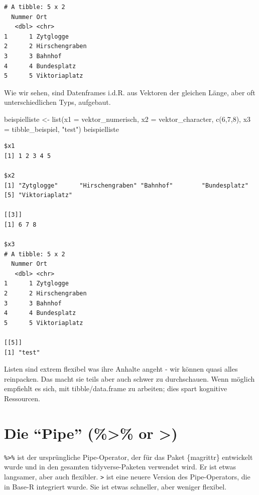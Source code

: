 \documentclass[
  letterpaper,
  DIV=11,
  numbers=noendperiod]{scrreprt}
\newenvironment{Shaded}{\begin{snugshade}}{\end{snugshade}}
\newcommand{\AttributeTok}[1]{\textcolor[rgb]{0.40,0.45,0.13}{#1}}
\newcommand{\DecValTok}[1]{\textcolor[rgb]{0.68,0.00,0.00}{#1}}
\newcommand{\FunctionTok}[1]{\textcolor[rgb]{0.28,0.35,0.67}{#1}}
\newcommand{\NormalTok}[1]{\textcolor[rgb]{0.00,0.23,0.31}{#1}}
\newcommand{\OtherTok}[1]{\textcolor[rgb]{0.00,0.23,0.31}{#1}}
\newcommand{\StringTok}[1]{\textcolor[rgb]{0.13,0.47,0.30}{#1}}
\begin{document}
\begin{verbatim}
# A tibble: 5 x 2
  Nummer Ort           
   <dbl> <chr>         
1      1 Zytglogge     
2      2 Hirschengraben
3      3 Bahnhof       
4      4 Bundesplatz   
5      5 Viktoriaplatz 
\end{verbatim}

Wie wir sehen, sind Datenframes i.d.R. aus Vektoren der gleichen Länge,
aber oft unterschiedlichen Typs, aufgebaut.

\begin{Shaded}
\begin{Highlighting}[]
\NormalTok{beispielliste }\OtherTok{\textless{}{-}} \FunctionTok{list}\NormalTok{(}\AttributeTok{x1 =}\NormalTok{ vektor\_numerisch, }\AttributeTok{x2 =}\NormalTok{ vektor\_character, }\FunctionTok{c}\NormalTok{(}\DecValTok{6}\NormalTok{,}\DecValTok{7}\NormalTok{,}\DecValTok{8}\NormalTok{), }\AttributeTok{x3 =}\NormalTok{ tibble\_beispiel, }\StringTok{"test"}\NormalTok{)}
\NormalTok{beispielliste}
\end{Highlighting}
\end{Shaded}

\begin{verbatim}
$x1
[1] 1 2 3 4 5

$x2
[1] "Zytglogge"      "Hirschengraben" "Bahnhof"        "Bundesplatz"   
[5] "Viktoriaplatz" 

[[3]]
[1] 6 7 8

$x3
# A tibble: 5 x 2
  Nummer Ort           
   <dbl> <chr>         
1      1 Zytglogge     
2      2 Hirschengraben
3      3 Bahnhof       
4      4 Bundesplatz   
5      5 Viktoriaplatz 

[[5]]
[1] "test"
\end{verbatim}

Listen sind extrem flexibel was ihre Anhalte angeht - wir können quasi
alles reinpacken. Das macht sie teils aber auch schwer zu durchschauen.
Wenn möglich empfiehlt es sich, mit tibble/data.frame zu arbeiten; dies
spart kognitive Ressourcen.


\chapter{Die ``Pipe'' (\%\textgreater\% or
\textbar\textgreater)}\label{die-pipe-or}

\texttt{\%\textgreater{}\%} ist der ursprüngliche Pipe-Operator, der für
das Paket \{magrittr\} entwickelt wurde und in den gesamten
tidyverse-Paketen verwendet wird. Er ist etwas langsamer, aber auch
flexibler. \texttt{\textbar{}\textgreater{}} ist eine neuere Version des
Pipe-Operators, die in Base-R integriert wurde. Sie ist etwas schneller,
aber weniger flexibel.
\end{document}
